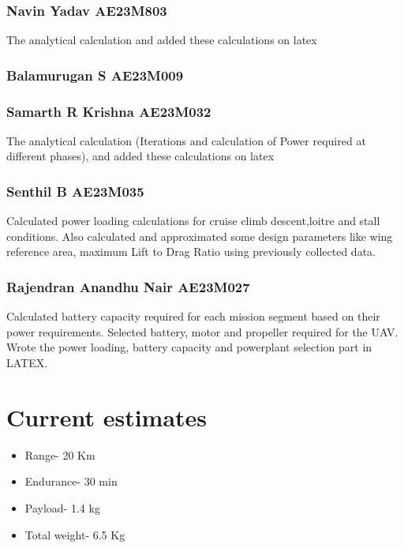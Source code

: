 \documentclass[12 pt]{article}
\begin{document}
\subsubsection{Navin Yadav AE23M803}
The analytical calculation and added these calculations on latex 

\subsubsection{Balamurugan S AE23M009}


\subsubsection{Samarth R Krishna AE23M032}
The analytical calculation (Iterations and calculation of Power required at different phases), and added these calculations on latex


\subsubsection{Senthil B AE23M035}
Calculated power loading calculations for cruise climb descent,loitre and stall conditions. Also calculated and approximated some design parameters like wing reference area, maximum Lift to Drag Ratio using previously collected data.

\subsubsection{Rajendran Anandhu Nair AE23M027}
Calculated battery capacity required for each mission segment based on their power requirements. Selected battery, motor and propeller required for the UAV. Wrote the power loading, battery capacity and powerplant selection part in LATEX. 


\newpage

\section{Current estimates}
\begin{itemize}
    \item Range- 20 Km
    \item Endurance- 30 min
    \item Payload- 1.4 kg
    \item Total weight- 6.5 Kg
\end{itemize}
\end{document}
